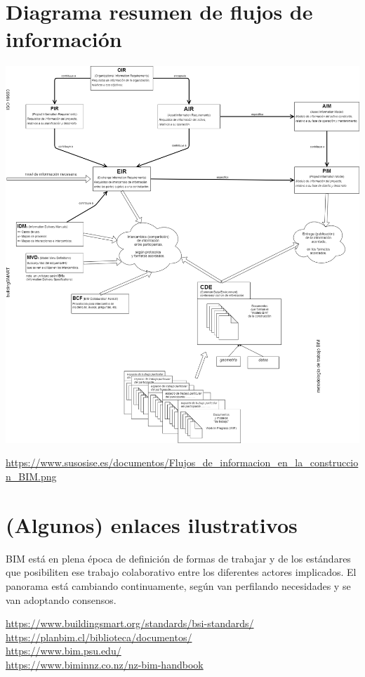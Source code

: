 \documentclass[spanish,12pt,a4paper,final,oneside]{book}
\begin{document}
\section{Diagrama resumen de flujos de información}
\includegraphics[width=1.2\textwidth]{Flujos de informacion en la construccion BIM}

{\footnotesize  \url{https://www.susosise.es/documentos/Flujos\_de\_informacion\_en\_la\_construccion\_BIM.png}}

\section{(Algunos) enlaces ilustrativos}
BIM está en plena época de definición de formas de trabajar y de los estándares que posibiliten ese trabajo colaborativo entre los diferentes actores implicados. El panorama está cambiando continuamente, según van perfilando necesidades y se van adoptando consensos.

\url{https://www.buildingsmart.org/standards/bsi-standards/}
\\ \url{https://planbim.cl/biblioteca/documentos/}
\\ \url{https://www.bim.psu.edu/}
\\ \url{https://www.biminnz.co.nz/nz-bim-handbook}
\end{document}

